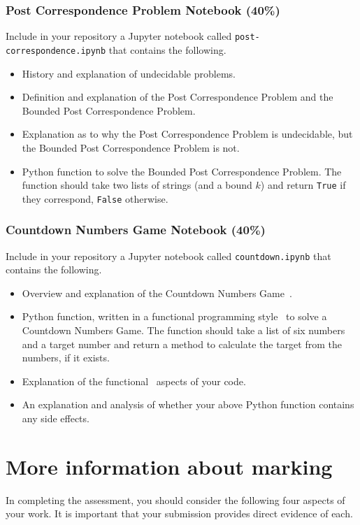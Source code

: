 \documentclass[a4paper, 12pt]{scrartcl}
\begin{document}
  \subsubsection*{Post Correspondence Problem Notebook (40\%)}
  Include in your repository a Jupyter notebook called \texttt{post-correspondence.ipynb} that contains the following.
  \begin{itemize}
    \item History and explanation of undecidable problems.
    \item Definition and explanation of the Post Correspondence Problem and the Bounded Post Correspondence Problem.
    \item Explanation as to why the Post Correspondence Problem is undecidable, but the Bounded Post Correspondence Problem is not.
    \item Python function to solve the Bounded Post Correspondence Problem. The function should take two lists of strings (and a bound $k$) and return \texttt{True} if they correspond, \texttt{False} otherwise.
  \end{itemize}
  
  \subsubsection*{Countdown Numbers Game Notebook (40\%)}
  Include in your repository a Jupyter notebook called \texttt{countdown.ipynb} that contains the following.
  \begin{itemize}
    \item Overview and explanation of the Countdown Numbers Game~\cite{countdownnumbers}.
    \item Python function, written in a functional programming style~\cite{pythonfunctional} to solve a Countdown Numbers Game. The function should take a list of six numbers and a target number and return a method to calculate the target from the numbers, if it exists.
    \item Explanation of the functional~\cite{pythonfunctional} aspects of your code.
    \item An explanation and analysis of whether your above Python function contains any side effects.
  \end{itemize}

  \section*{More information about marking}
    In completing the assessment, you should consider the following four aspects of your work.
    It is important that your submission provides direct evidence of each.
    
\end{document}

